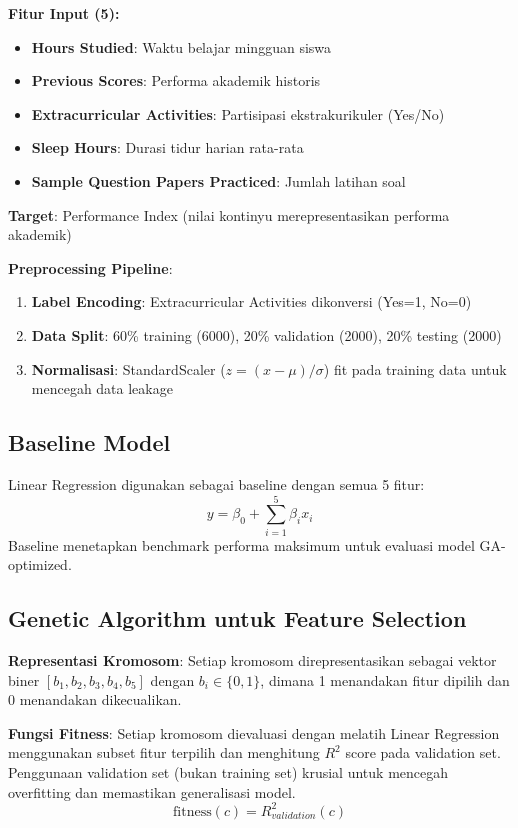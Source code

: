 \documentclass[conference]{IEEEtran}
\begin{document}
\textbf{Fitur Input (5):}
\begin{itemize}
    \item \textbf{Hours Studied}: Waktu belajar mingguan siswa
    \item \textbf{Previous Scores}: Performa akademik historis
    \item \textbf{Extracurricular Activities}: Partisipasi ekstrakurikuler (Yes/No)
    \item \textbf{Sleep Hours}: Durasi tidur harian rata-rata
    \item \textbf{Sample Question Papers Practiced}: Jumlah latihan soal
\end{itemize}

\textbf{Target}: Performance Index (nilai kontinyu merepresentasikan performa akademik)

\textbf{Preprocessing Pipeline}:
\begin{enumerate}
    \item \textbf{Label Encoding}: Extracurricular Activities dikonversi (Yes=1, No=0)
    \item \textbf{Data Split}: 60\% training (6000), 20\% validation (2000), 20\% testing (2000)
    \item \textbf{Normalisasi}: StandardScaler ($z = (x-\mu)/\sigma$) fit pada training data untuk mencegah data leakage
\end{enumerate}

\subsection{Baseline Model}
Linear Regression digunakan sebagai baseline dengan semua 5 fitur:
\begin{equation}
y = \beta_0 + \sum_{i=1}^{5} \beta_i x_i
\end{equation}
Baseline menetapkan benchmark performa maksimum untuk evaluasi model GA-optimized.

\subsection{Genetic Algorithm untuk Feature Selection}

\textbf{Representasi Kromosom}: Setiap kromosom direpresentasikan sebagai vektor biner $[b_1, b_2, b_3, b_4, b_5]$ dengan $b_i \in \{0,1\}$, dimana 1 menandakan fitur dipilih dan 0 menandakan dikecualikan.

\textbf{Fungsi Fitness}: Setiap kromosom dievaluasi dengan melatih Linear Regression menggunakan subset fitur terpilih dan menghitung $R^2$ score pada validation set. Penggunaan validation set (bukan training set) krusial untuk mencegah overfitting dan memastikan generalisasi model.
\begin{equation}
\text{fitness}(c) = R^2_{validation}(c)
\end{equation}
\end{document}
